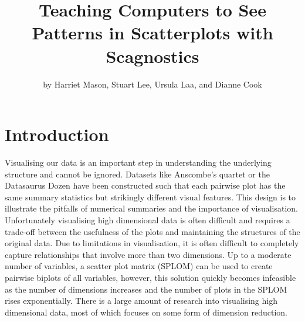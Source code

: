 \title{Teaching Computers to See Patterns in Scatterplots with
Scagnostics}
\author{by Harriet Mason, Stuart Lee, Ursula Laa, and Dianne Cook}

\maketitle


\hypertarget{introduction}{%
\section{Introduction}\label{introduction}}

Visualising our data is an important step in understanding the
underlying structure and cannot be ignored. Datasets like Anscombe's
quartet \citep{anscombe} or the Datasaurus Dozen \citep{datasaurpkg}
have been constructed such that each pairwise plot has the same summary
statistics but strikingly different visual features. This design is to
illustrate the pitfalls of numerical summaries and the importance of
visualisation. Unfortunately visualising high dimensional data is often
difficult and requires a trade-off between the usefulness of the plots
and maintaining the structures of the original data. Due to limitations
in visualisation, it is often difficult to completely capture
relationships that involve more than two dimensions. Up to a moderate
number of variables, a scatter plot matrix (SPLOM) can be used to create
pairwise biplots of all variables, however, this solution quickly
becomes infeasible as the number of dimensions increases and the number
of plots in the SPLOM rises exponentially. There is a large amount of
research into visualising high dimensional data, most of which focuses
on some form of dimension reduction.


